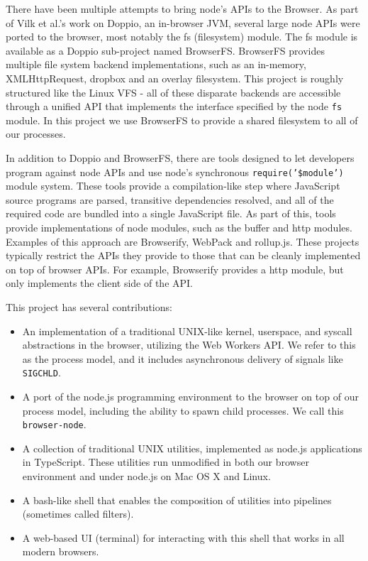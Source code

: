 \documentclass{acm_proc_article-sp}
\begin{document}
There have been multiple attempts to bring node's APIs to the Browser.
As part of Vilk et al.'s work on Doppio, an in-browser JVM, several
large node APIs were ported to the browser, most notably the fs
(filesystem) module.  The fs module is available as a Doppio
sub-project named BrowserFS.  BrowserFS provides multiple file system
backend implementations, such as an in-memory, XMLHttpRequest, dropbox
and an overlay filesystem.  This project is roughly structured like
the Linux VFS - all of these disparate backends are accessible through
a unified API that implements the interface specified by the node
\texttt{fs} module.  In this project we use BrowserFS to provide a
shared filesystem to all of our processes.

In addition to Doppio and BrowserFS, there are tools designed to let
developers program against node APIs and use node's synchronous
\texttt{require('\$module')} module system.  These tools provide a
compilation-like step where JavaScript source programs are parsed,
transitive dependencies resolved, and all of the required code are
bundled into a single JavaScript file.  As part of this, tools provide
implementations of node modules, such as the buffer and http modules.
Examples of this approach are Browserify, WebPack and rollup.js.
These projects typically restrict the APIs they provide to those that
can be cleanly implemented on top of browser APIs.  For example,
Browserify provides a http module, but only implements the client side
of the API.

This project has several contributions:

\begin{itemize}
  \item An implementation of a traditional UNIX-like kernel,
    userspace, and syscall abstractions in the browser, utilizing the
    Web Workers API.  We refer to this as the process model, and it
    includes asynchronous delivery of signals like \texttt{SIGCHLD}.
  \item A port of the node.js programming environment to the browser
    on top of our process model, including the ability to spawn child
    processes.  We call this \texttt{browser-node}.
  \item A collection of traditional UNIX utilities, implemented as
    node.js applications in TypeScript.  These utilities run
    unmodified in both our browser environment and under node.js on
    Mac OS X and Linux.
  \item A bash-like shell that enables the composition of utilities
    into pipelines (sometimes called filters).
  \item A web-based UI (terminal) for interacting with this shell that
    works in all modern browsers.
\end{itemize}
\end{document}
